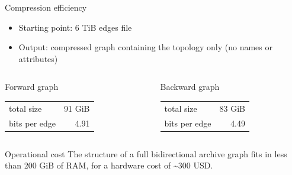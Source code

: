 \documentclass[aspectratio=169,xcolor=table]{beamer}
\begin{document}
    \begin{frame}{Compression efficiency}
        \begin{block}{}
            \begin{itemize}
                \item Starting point: 6 TiB edges file
                \item Output: compressed graph containing the topology only (no
                    names or attributes)
            \end{itemize}
        \end{block}
        \begin{columns}
            \begin{column}{0.4\columnwidth}
                \begin{block}{Forward graph}
                    \begin{center}
                        \begin{tabular}{lr}
                            total size & 91 GiB\\
                            bits per edge & 4.91\\
                        \end{tabular}
                    \end{center}
                \end{block}
            \end{column}
            \begin{column}{0.4\columnwidth}
                \begin{block}{Backward graph}
                    \begin{center}
                        \begin{tabular}{lr}
                            total size & 83 GiB\\
                            bits per edge & 4.49\\
                        \end{tabular}
                    \end{center}
                    \vfill
                \end{block}
            \end{column}
        \end{columns}
        \begin{block}{Operational cost}
            The structure of a full bidirectional archive graph fits in less than 200
            GiB of RAM, for a hardware cost of \textasciitilde{}300 USD.
        \end{block}
    \end{frame}
\end{document}
